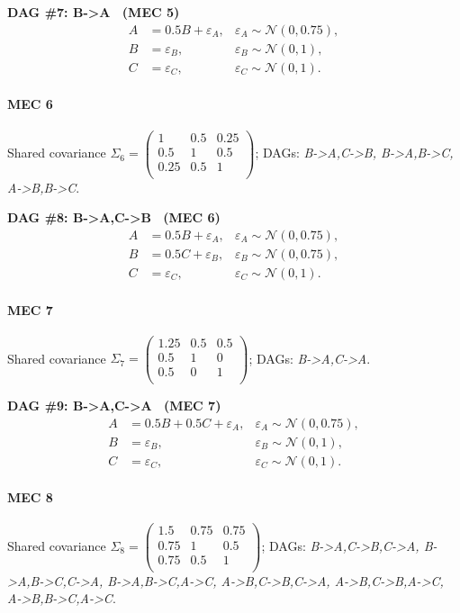\documentclass[11pt]{article}
\begin{document}
\noindent\textbf{DAG \#7: B->A \ (MEC 5)}
\begin{align*}
A &= 0.5 B + \varepsilon_A, & \varepsilon_A \sim \mathcal{N}(0, 0.75),\\B &= \varepsilon_B, & \varepsilon_B \sim \mathcal{N}(0, 1),\\C &= \varepsilon_C, & \varepsilon_C \sim \mathcal{N}(0, 1).
\end{align*}

\paragraph{MEC 6} Shared covariance \(\Sigma_6=\begin{pmatrix}1 & 0.5 & 0.25 \\0.5 & 1 & 0.5 \\0.25 & 0.5 & 1 \\\end{pmatrix}\); DAGs: \emph{B->A,C->B, B->A,B->C, A->B,B->C}.

\noindent\textbf{DAG \#8: B->A,C->B \ (MEC 6)}
\begin{align*}
A &= 0.5 B + \varepsilon_A, & \varepsilon_A \sim \mathcal{N}(0, 0.75),\\B &= 0.5 C + \varepsilon_B, & \varepsilon_B \sim \mathcal{N}(0, 0.75),\\C &= \varepsilon_C, & \varepsilon_C \sim \mathcal{N}(0, 1).
\end{align*}

\paragraph{MEC 7} Shared covariance \(\Sigma_7=\begin{pmatrix}1.25 & 0.5 & 0.5 \\0.5 & 1 & 0 \\0.5 & 0 & 1 \\\end{pmatrix}\); DAGs: \emph{B->A,C->A}.

\noindent\textbf{DAG \#9: B->A,C->A \ (MEC 7)}
\begin{align*}
A &= 0.5 B + 0.5 C + \varepsilon_A, & \varepsilon_A \sim \mathcal{N}(0, 0.75),\\B &= \varepsilon_B, & \varepsilon_B \sim \mathcal{N}(0, 1),\\C &= \varepsilon_C, & \varepsilon_C \sim \mathcal{N}(0, 1).
\end{align*}

\paragraph{MEC 8} Shared covariance \(\Sigma_8=\begin{pmatrix}1.5 & 0.75 & 0.75 \\0.75 & 1 & 0.5 \\0.75 & 0.5 & 1 \\\end{pmatrix}\); DAGs: \emph{B->A,C->B,C->A, B->A,B->C,C->A, B->A,B->C,A->C, A->B,C->B,C->A, A->B,C->B,A->C, A->B,B->C,A->C}.
\end{document}
